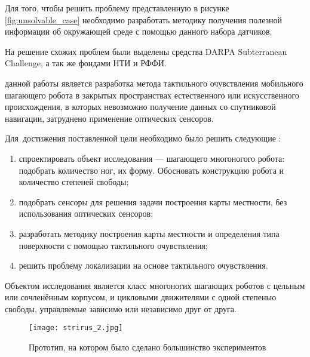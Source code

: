 Для того, чтобы решить проблему представленную в рисунке \ref{fig:unsolvable_case} необходимо разработать методику получения полезной информации об окружающей среде с помощью данного набора датчиков.

На решение схожих проблем были выделены средства DARPA Subterranean Challenge, а так же фондами НТИ и РФФИ.


{\aim} данной работы является разработка метода тактильного очувствления мобильного шагающего робота в закрытых пространствах естественного или искусственного происхождения, в которых невозможно получение данных со спутниковой навигации, затруднено применение оптических сенсоров.

Для~достижения поставленной цели необходимо было решить следующие {\tasks}:
\begin{enumerate}[beginpenalty=10000] %
  \item спроектировать объект исследования --- шагающего многоногого робота: подобрать количество ног, их форму. Обосновать конструкцию робота и количество степеней свободы;
  \item подобрать сенсоры для решения задачи построения карты местности, без использования оптических сенсоров;
  \item разработать методику построения карты местности и определения типа поверхности с помощью тактильного очувствления;
  \item решить проблему локализации на основе тактильного очувствления.
\end{enumerate}

{\researchobj}
Объектом исследования является класс многоногих шагающих роботов с цельным или сочленённым корпусом, и цикловыми движителями с одной степенью свободы, управляемые зависимо или независимо друг от друга.

\begin{figure}[H]
  \centering\texttt{[image: strirus\_2.jpg]}
  \caption{Прототип, на котором было сделано большинство экспериментов}
  \label{fig:strirus_2.jpgg}
\end{figure}

